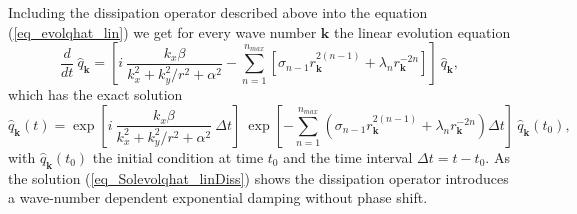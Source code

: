 Including the dissipation operator described above into the
equation (\ref{eq_evolqhat_lin}) we get for every wave number $\mathbf{k}$ 
the linear evolution equation
\begin{equation}  \label{eq_evolqhat_linDiss}
  \frac{d}{dt} \ \hat{q}_{\mathbf{k}}
   =
  \left[
   i \ \frac{k_{x} \beta}{k_{x}^{2} + k_{y}^{2}/r^{2} + \alpha^{2}} 
    -
   \sum_{n=1}^{n_{max}} 
    \left[
     \sigma_{n-1} r^{2(n-1)}_{\mathbf{k}}
      + 
     \lambda_{n} r^{-2n}_{\mathbf{k}}
    \right]
  \right] \ \hat{q}_{\mathbf{k}},
\end{equation}
which has the exact solution
\begin{equation} \label{eq_Solevolqhat_linDiss}
 \hat{q}_{\mathbf{k}}(t)
  = 
 \exp
  \left[
    i \ \frac{k_{x} \beta}{k_{x}^{2} + k_{y}^{2}/r^{2} + \alpha^{2}}
   \ \Delta t 
  \right] 
  \ 
 \exp
  \left[
    - \sum_{n=1}^{n_{max}} 
       \left(
        \sigma_{n-1} r^{2(n-1)}_{\mathbf{k}}
          + 
        \lambda_{n} r^{-2n}_{\mathbf{k}}
       \right)
   \Delta t 
  \right] 
 \ \hat{q}_{\mathbf{k}}(t_{0}),
\end{equation}
with $\hat{q}_{\mathbf{k}}(t_{0})$ the initial condition at time $t_{0}$
and the time interval $\Delta t = t - t_{0}$. As the solution 
(\ref{eq_Solevolqhat_linDiss}) shows the dissipation operator introduces
a wave-number dependent exponential damping without phase shift.  

